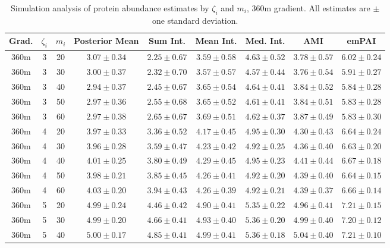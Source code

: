 \begin{table}
\begin{center}
\caption{Simulation analysis of protein abundance estimates by $\zeta_i$ and $m_i$, 360m gradient. All estimates are $\pm$ one standard deviation. \label{supp:proteomics:tab:sim_estimates_360m}}
\begin{tabular}{ccc|c|ccccc}
 Grad. & $\zeta_i$ & $m_i$ & Posterior Mean & Sum Int. & Mean Int. & Med. Int. & AMI & emPAI \\ 
 \hline
360m &   3 &  20 & $3.07 \pm 0.34$ & $2.25 \pm 0.67$ & $3.59 \pm 0.58$ & $4.63 \pm 0.52$ & $3.78 \pm 0.57$ & $6.02 \pm 0.24$ \\ 
  360m &   3 &  30 & $3.00 \pm 0.37$ & $2.32 \pm 0.70$ & $3.57 \pm 0.57$ & $4.57 \pm 0.44$ & $3.76 \pm 0.54$ & $5.91 \pm 0.27$ \\ 
  360m &   3 &  40 & $2.94 \pm 0.37$ & $2.45 \pm 0.67$ & $3.65 \pm 0.54$ & $4.64 \pm 0.41$ & $3.84 \pm 0.52$ & $5.84 \pm 0.28$ \\ 
  360m &   3 &  50 & $2.97 \pm 0.36$ & $2.55 \pm 0.68$ & $3.65 \pm 0.52$ & $4.61 \pm 0.41$ & $3.84 \pm 0.51$ & $5.83 \pm 0.28$ \\ 
  360m &   3 &  60 & $2.97 \pm 0.38$ & $2.65 \pm 0.67$ & $3.69 \pm 0.51$ & $4.62 \pm 0.37$ & $3.87 \pm 0.49$ & $5.83 \pm 0.30$ \\ 
   \hline
360m &   4 &  20 & $3.97 \pm 0.33$ & $3.36 \pm 0.52$ & $4.17 \pm 0.45$ & $4.95 \pm 0.30$ & $4.30 \pm 0.43$ & $6.64 \pm 0.24$ \\ 
  360m &   4 &  30 & $3.96 \pm 0.28$ & $3.59 \pm 0.47$ & $4.23 \pm 0.42$ & $4.92 \pm 0.25$ & $4.36 \pm 0.40$ & $6.63 \pm 0.20$ \\ 
  360m &   4 &  40 & $4.01 \pm 0.25$ & $3.80 \pm 0.49$ & $4.29 \pm 0.45$ & $4.95 \pm 0.23$ & $4.41 \pm 0.44$ & $6.67 \pm 0.18$ \\ 
  360m &   4 &  50 & $3.98 \pm 0.21$ & $3.85 \pm 0.45$ & $4.26 \pm 0.41$ & $4.92 \pm 0.20$ & $4.39 \pm 0.40$ & $6.64 \pm 0.15$ \\ 
  360m &   4 &  60 & $4.03 \pm 0.20$ & $3.94 \pm 0.43$ & $4.26 \pm 0.39$ & $4.92 \pm 0.21$ & $4.39 \pm 0.37$ & $6.66 \pm 0.14$ \\ 
   \hline
360m &   5 &  20 & $4.99 \pm 0.24$ & $4.46 \pm 0.42$ & $4.90 \pm 0.41$ & $5.35 \pm 0.22$ & $4.96 \pm 0.41$ & $7.21 \pm 0.15$ \\ 
  360m &   5 &  30 & $4.99 \pm 0.20$ & $4.66 \pm 0.41$ & $4.93 \pm 0.40$ & $5.36 \pm 0.20$ & $4.99 \pm 0.40$ & $7.20 \pm 0.12$ \\ 
  360m &   5 &  40 & $5.00 \pm 0.17$ & $4.85 \pm 0.41$ & $4.99 \pm 0.41$ & $5.36 \pm 0.18$ & $5.04 \pm 0.40$ & $7.21 \pm 0.10$ \\ 

\end{tabular}
\end{center}
\end{table}
